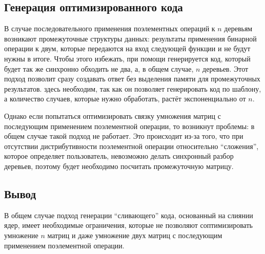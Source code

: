 \subsection{Генерация оптимизированного кода}
В случае последовательного применения поэлементных операций к $n$ деревьям возникают промежуточные структуры данных: результаты применения  бинарной операции к двум, которые передаются на вход следующей функции и не будут нужны в итоге.
Чтобы этого избежать, при помощи \Th{} генерируется код, который будет так же синхронно обходить не два, а, в общем случае, $n$ деревьев.
Этот подход позволит сразу создавать ответ без выделения памяти для промежуточных результатов.
\Th{} здесь необходим, так как он позволяет генерировать код по шаблону, а количество случаев, которые нужно обработать, растёт экспоненциально от $n$.

Однако если попытаться оптимизировать связку умножения матриц с последующим применением поэлементной операции, то возникнут проблемы: в общем случае такой подход не работает.
Это происходит из-за того, что при отсутствии дистрибутивности поэлементной операции относительно \enquote{сложения}, которое определяет пользователь, невозможно делать синхронный разбор деревьев, поэтому будет необходимо посчитать промежуточную матрицу.
\subsection{Вывод}
В общем случае подход генерации \enquote{сливающего} кода, основанный на слиянии ядер, имеет необходимые ограничения, которые не позволяют соптимизировать умножение $n$ матриц и даже умножение двух матриц с последующим применением поэлементной операции.
